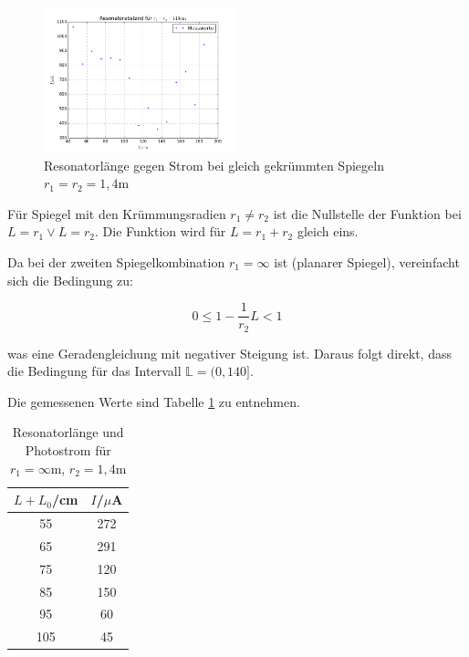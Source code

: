 \begin{figure}
	\centering
	\includegraphics[width=0.5\textwidth]{plots/stabil1}
	\caption{Resonatorlänge gegen Strom bei gleich gekrümmten Spiegeln \(r_1=r_2=1,4\)m}
	\label{fig:stabil1}
\end{figure}

\noindent Für Spiegel mit den Krümmungsradien \(r_1\neq r_2\) ist die Nullstelle der Funktion bei \(L=r_1\lor L=r_2\). Die Funktion wird für \(L=r_1+r_2\) gleich eins.

\noindent Da bei der zweiten Spiegelkombination \(r_1=\infty\) ist (planarer Spiegel), vereinfacht sich die Bedingung zu:

\begin{equation}
0\le1-\frac{1}{r_2}L<1
\end{equation}

\noindent was eine Geradengleichung mit negativer Steigung ist. Daraus folgt direkt, dass die Bedingung für das Intervall \(\mathbb{L}=(0,140]\).

\noindent Die gemessenen Werte sind Tabelle \ref{tab:t2} zu entnehmen.

\begin{table}[H]
	\begin{center}
		\begin{tabular}{c c}
			\toprule
			\(L+L_0\)/cm & \(I\)/\(\mu\)A \\
			\midrule
			55              &272\\                                                                           
			65              &291\\                                                                             
			75              &120\\                                                                               
			85              &150\\                                                                                 
			95              &60\\                                                                                  
			105             &45\\
			\bottomrule
		\end{tabular}
		\caption{Resonatorlänge und Photostrom für \(r_1=\infty\)m, \(r_2=1,4\)m}
		\label{tab:t2}
	\end{center}
\end{table}

